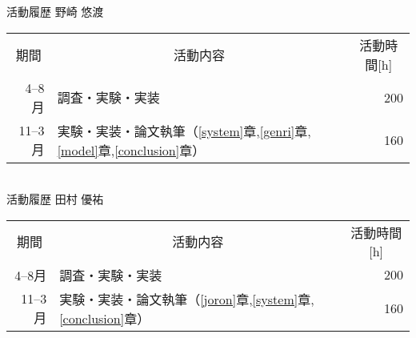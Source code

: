 

\thispagestyle{empty}

\begin{table}[tbp]
\large
\centering


	

{\gtfamily 活動履歴} 野崎 悠渡\\
\begin{tabular}{rlr}
\hline
\multicolumn{1}{c}{{\gtfamily 期間}}&
\multicolumn{1}{c}{{\gtfamily 活動内容}}&
\multicolumn{1}{c}{{\gtfamily 活動時間[h]}}
\\
4--8月 & 調査・実験・実装 & 200 \\
11--3月 & 実験・実装・論文執筆（\ref{system}章,\ref{genri}章,\ref{model}章,\ref{conclusion}章） & 160\\
\hline
\end{tabular}\\
\vspace{2in}
{\gtfamily 活動履歴} 田村 優祐\\
\begin{tabular}{rlr}
\hline
\multicolumn{1}{c}{{\gtfamily 期間}}&
\multicolumn{1}{c}{{\gtfamily 活動内容}}&
\multicolumn{1}{c}{{\gtfamily 活動時間[h]}}
\\
4--8月 & 調査・実験・実装 & 200 \\
11--3月 & 実験・実装・論文執筆（\ref{joron}章,\ref{system}章,\ref{conclusion}章） & 160\\
\hline
\end{tabular}\\

\end{table}
\clearpage
